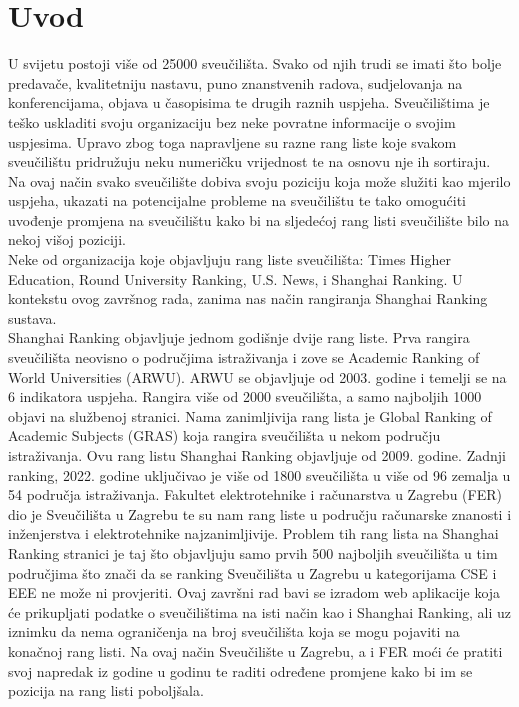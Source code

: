 \documentclass[times, utf8, zavrsni]{fer}
\begin{document}
\chapter{Uvod}
U svijetu postoji više od 25000 sveučilišta. Svako od njih trudi se imati što bolje predavače, kvalitetniju nastavu, puno znanstvenih radova, sudjelovanja na konferencijama,
objava u časopisima te drugih raznih uspjeha. Sveučilištima je teško uskladiti svoju organizaciju bez neke povratne informacije o svojim uspjesima. Upravo zbog toga napravljene su razne
rang liste koje svakom sveučilištu pridružuju neku numeričku vrijednost te na osnovu nje ih sortiraju. Na ovaj način svako sveučilište dobiva svoju poziciju 
koja može služiti kao mjerilo uspjeha, ukazati na potencijalne probleme na sveučilištu te tako omogućiti uvođenje promjena na sveučilištu kako bi 
na sljedećoj rang listi sveučilište bilo na nekoj višoj poziciji.\\ Neke od organizacija koje objavljuju rang liste sveučilišta: Times Higher Education, Round University Ranking,
U.S. News, i Shanghai Ranking. U kontekstu ovog završnog rada, zanima nas način rangiranja Shanghai Ranking sustava. \\ Shanghai Ranking objavljuje jednom godišnje dvije 
rang liste. Prva rangira sveučilišta neovisno o područjima istraživanja i zove se Academic Ranking of World Universities (ARWU). ARWU se objavljuje od 2003. godine i  
temelji se na 6 indikatora uspjeha. Rangira više od 2000 sveučilišta, a samo najboljih 1000 objavi na službenoj stranici. Nama zanimljivija rang lista je Global Ranking of Academic Subjects
(GRAS) koja rangira sveučilišta u nekom području istraživanja. Ovu rang listu Shanghai Ranking objavljuje od 2009. godine. Zadnji ranking, 2022. godine uključivao je više od 1800 sveučilišta 
u više od 96 zemalja u 54 područja istraživanja. Fakultet elektrotehnike i računarstva u Zagrebu (FER) dio je Sveučilišta u Zagrebu te su nam rang liste u području 
računarske znanosti i inženjerstva  i elektrotehnike  najzanimljivije. Problem tih rang lista 
na Shanghai Ranking stranici je taj što objavljuju samo prvih 500 najboljih sveučilišta u tim područjima što znači da se ranking Sveučilišta u Zagrebu u kategorijama
CSE i EEE ne može ni provjeriti. 
Ovaj završni rad bavi se izradom web aplikacije koja će prikupljati podatke o sveučilištima na isti način kao i Shanghai Ranking, ali uz iznimku da nema ograničenja na 
broj sveučilišta koja se mogu pojaviti na konačnoj rang listi. Na ovaj način Sveučilište u Zagrebu, a i FER moći će pratiti svoj napredak iz godine u godinu te raditi određene 
promjene kako bi im se pozicija na rang listi poboljšala. 
\end{document}
